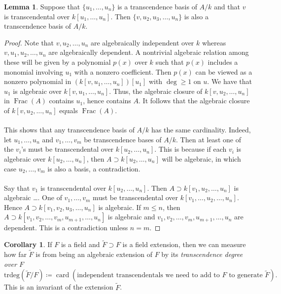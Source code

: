 \documentclass[10pt,letterpaper,cm]{nupset}
\theoremstyle{definition}
\newtheorem{corollary}{Corollary}
\newtheorem{lemma}{Lemma}
\newcommand{\1}{\mathbf{1}}
\newcommand{\0}{\vec 0}
\DeclareMathOperator{\card}{\text{card}}
\DeclareMathOperator{\Frac}{Frac}
\begin{document}
\begin{lemma}
Suppose that $\{u_1, \ldots, u_n\}$ is a transcendence basis of $A/k$ and that $v$ is transcendental over $k[u_1, \ldots, u_n]$. Then $\{ v, u_2, u_3, \ldots, u_n \}$ is also a transcendence basis of $A/k$.
\end{lemma}
\begin{proof}
Note that $v, u_2, \ldots, u_n$ are algebraically independent over $k$ whereas $v, u_1, u_2, \ldots, u_n$ are algebraically dependent. A nontrivial algebraic relation among these will be given by a polynomial $p(x)$ over $k$ such that $p(x)$ includes a monomial involving $u_1$ with a nonzero coefficient. Then $p(x)$ can be viewed as a nonzero polynomial in $(k[v, u_1, \ldots, u_n])[u_1]$ with $\deg \geq 1$ on $u$. We have that $u_1$ is algebraic over $k[v, u_1, \ldots, u_n]$. Thus, the algebraic closure of $k[v, u_2, \ldots, u_n]$ in $\Frac(A)$ contains $u_1$, hence contains $A$. It follows that the algebraic closure of $k[v, u_2, \ldots, u_n]$ equals $\Frac(A)$.
\\ \\
This shows that any transcendence basis of $A / k$ has the same cardinality. Indeed, let $u_1, \ldots, u_n$ and $v_1, \ldots, v_m$ be transcendence bases of $A/k$. Then at least one of the $v_i$'s must be transcendental over $k[u_2, \ldots, u_n]$. This is because if each $v_i$ is algebraic over $k[u_2, \ldots, u_n]$, then $A \supset k[u_2, \ldots, u_n]$ will be algebraic, in which case $u_2, \ldots, v_m$ is also a basis, a contradiction. 
\\ \\
Say that $v_1$ is transcendental over $k[u_2, \ldots, u_n]$. Then $A \supset k[v_1, u_2, \ldots, u_n]$ is algebraic \ldots . One of $v_1, \ldots, v_m$ must be transcendental over $k[v_1, \ldots, u_2, \ldots, u_n]$. Hence $A \supset k[v_1, v_2, u_3, \ldots, u_n]$ is algebraic. If $m \leq n$, then $A \supset k[v_1, v_2, \ldots, v_m, u_{m+1}, \ldots, u_n]$ is algebraic and $v_1, v_2, \ldots, v_m, u_{m+1}, \ldots, u_n$ are dependent. This is a contradiction unless $n=m$. 
\end{proof}

\begin{corollary}
If $F$ is a field and $\widetilde{F}\supset F$ is a field extension, then we can measure how far $\widetilde{F}$ is from being an algebraic extension of $F$ by its \textit{transcendence degree over $F$} $$\text{trdeg}(\widetilde{F}/F) \coloneqq  \card(\text{independent transcendentals we need to add to } F \text{ to generate } \widetilde{F}).$$ This is an invariant of the extension $\widetilde{F}$.
\end{corollary}
\end{document}
